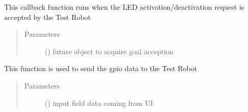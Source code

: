 \documentclass[letterpaper,10pt,english]{sphinxmanual}
\begin{document}
\begin{fulllineitems}

\begin{fulllineitems}
\label{\detokenize{index:Control_Hub.control_hub.control_hub.ClientNode.goal_response_callback}}
This callback function runs when
the LED activation/deactivation request is accepted
by the Test Robot
\begin{quote}\begin{description}
\item[{Parameters}] \leavevmode
{} () \textendash{} future object to acquire goal acception

\end{description}\end{quote}

\end{fulllineitems}


\begin{fulllineitems}
\label{\detokenize{index:Control_Hub.control_hub.control_hub.ClientNode.send_goal}}
This function is used to send the gpio data
to the Test Robot
\begin{quote}\begin{description}
\item[{Parameters}] \leavevmode
{} () \textendash{} input field data coming from UI

\end{description}\end{quote}

\end{fulllineitems}


\end{fulllineitems}

\end{document}
